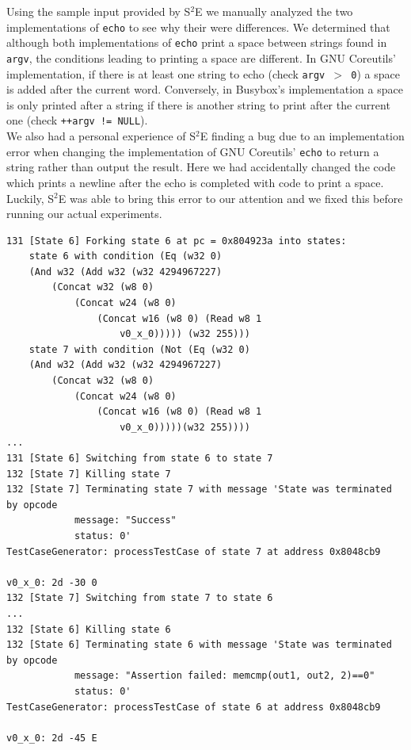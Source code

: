\documentclass[conference]{IEEEtran}
\begin{document}
Using the sample input provided by S$^2$E we manually analyzed the two implementations of {\tt echo} to see why their were differences. We determined that although both implementations of {\tt echo} print a space between strings found in {\tt argv}, the conditions leading to printing a space are different. In GNU Coreutils' implementation, if there is at least one string to echo (check {\tt argv {$>$} 0}) a space is added after the current word. Conversely, in Busybox's implementation a space is only printed after a string if there is another string to print after the current one (check {\tt *++argv !=  NULL}). \\

We also had a personal experience of S$^2$E finding a bug due to an implementation error when changing the implementation of GNU Coreutils' {\tt echo} to return a string rather than output the result. Here we had accidentally changed the code which prints a newline after the echo is completed with code to print a space. Luckily, S$^2$E was able to bring this error to our attention and we fixed this before running our actual experiments. \\

\begin{lstlisting}[style=C, label=s2e-equiv-result, abovecaptionskip=2ex, captionpos=b, caption={Partial output of equivalence testing for GNU Coreutils and Busybox}]
131 [State 6] Forking state 6 at pc = 0x804923a into states:
    state 6 with condition (Eq (w32 0)
    (And w32 (Add w32 (w32 4294967227)
        (Concat w32 (w8 0)
            (Concat w24 (w8 0)
                (Concat w16 (w8 0) (Read w8 1
                    v0_x_0))))) (w32 255)))
    state 7 with condition (Not (Eq (w32 0)
    (And w32 (Add w32 (w32 4294967227)
        (Concat w32 (w8 0)
            (Concat w24 (w8 0)
                (Concat w16 (w8 0) (Read w8 1 
                    v0_x_0)))))(w32 255))))
...
131 [State 6] Switching from state 6 to state 7
132 [State 7] Killing state 7
132 [State 7] Terminating state 7 with message 'State was terminated by opcode
            message: "Success"
            status: 0'
TestCaseGenerator: processTestCase of state 7 at address 0x8048cb9

v0_x_0: 2d -30 0
132 [State 7] Switching from state 7 to state 6
...
132 [State 6] Killing state 6
132 [State 6] Terminating state 6 with message 'State was terminated by opcode
            message: "Assertion failed: memcmp(out1, out2, 2)==0"
            status: 0'
TestCaseGenerator: processTestCase of state 6 at address 0x8048cb9

v0_x_0: 2d -45 E
\end{lstlisting}
\end{document}
